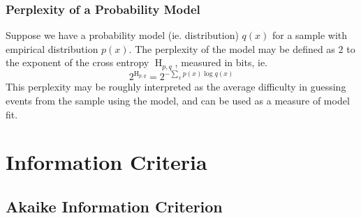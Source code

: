 \documentclass[11pt]{report} %
\begin{document}
\subsubsection{Perplexity of a Probability Model}

Suppose we have a probability model (ie. distribution) $q\left(x\right)$ for a sample with empirical distribution $p\left(x\right)$. The perplexity of the model may be defined as $2$ to the exponent of the cross entropy $\operatorname{H}_{p, q}$, measured in bits, ie.
\begin{equation}
2^{\operatorname{H}_{p, q}} = 2^{-\sum_{x}p\left(x\right)\log q\left(x\right)}
\end{equation}
This perplexity may be roughly interpreted as the average difficulty in guessing events from the sample using the model, and can be used as a measure of model fit.

\section{Information Criteria}

\subsection{Akaike Information Criterion}
\end{document}
